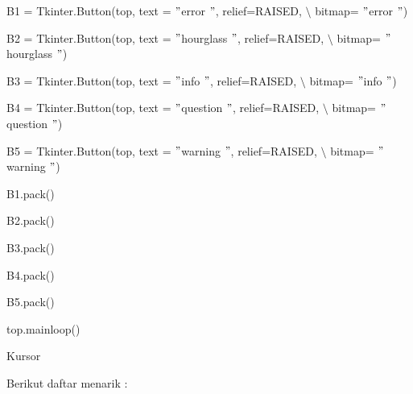 \documentclass [12pt,a4paper,notitlepage,oneside,bahasa]{article}
\begin{document}
\vspace{10pt}
{\fontsize{10pt}{10pt}\selectfont B1 = Tkinter.Button(top, text = $ " $error $ " $, relief=RAISED,  $  \setminus  $ bitmap= $ " $error $ " $)} \par
{\fontsize{10pt}{10pt}\selectfont B2 = Tkinter.Button(top, text = $ " $hourglass $ " $, relief=RAISED,  $  \setminus  $ bitmap= $ " $hourglass $ " $)} \par
{\fontsize{10pt}{10pt}\selectfont B3 = Tkinter.Button(top, text = $ " $info $ " $, relief=RAISED,  $  \setminus  $ bitmap= $ " $info $ " $)} \par
{\fontsize{10pt}{10pt}\selectfont B4 = Tkinter.Button(top, text = $ " $question $ " $, relief=RAISED,  $  \setminus  $ bitmap= $ " $question $ " $)} \par
{\fontsize{10pt}{10pt}\selectfont B5 = Tkinter.Button(top, text = $ " $warning $ " $, relief=RAISED,  $  \setminus  $ bitmap= $ " $warning $ " $)} \par
\vspace{10pt}
{\fontsize{10pt}{10pt}\selectfont B1.pack()} \par
{\fontsize{10pt}{10pt}\selectfont B2.pack()} \par
{\fontsize{10pt}{10pt}\selectfont B3.pack()} \par
{\fontsize{10pt}{10pt}\selectfont B4.pack()} \par
{\fontsize{10pt}{10pt}\selectfont B5.pack()} \par
{\fontsize{10pt}{10pt}\selectfont top.mainloop()} \par
\noindent 
Kursor \par
\noindent 
Berikut daftar menarik : \par
\noindent 
\end{document}
